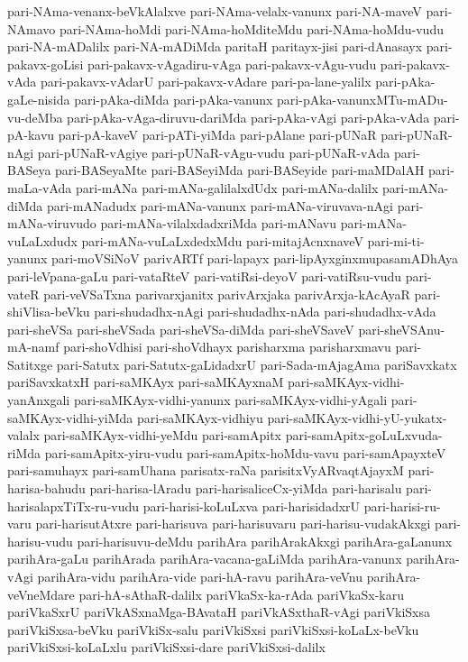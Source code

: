 {pari-NAma-venanx-beVkAlalxve
pari-NAma-velalx-vanunx
pari-NA-maveV
pari-NAmavo
pari-NAma-hoMdi
pari-NAma-hoMditeMdu
pari-NAma-hoMdu-vudu
pari-NA-mADalilx
pari-NA-mADiMda
paritaH
paritayx-jisi
pari-dAnasayx
pari-pakavx-goLisi
pari-pakavx-vAgadiru-vAga
pari-pakavx-vAgu-vudu
pari-pakavx-vAda
pari-pakavx-vAdarU
pari-pakavx-vAdare
pari-pa-lane-yalilx
pari-pAka-gaLe-nisida
pari-pAka-diMda
pari-pAka-vanunx
pari-pAka-vanunxMTu-mADu-vu-deMba
pari-pAka-vAga-diruvu-dariMda
pari-pAka-vAgi
pari-pAka-vAda
pari-pA-kavu
pari-pA-kaveV
pari-pATi-yiMda
pari-pAlane
pari-pUNaR
pari-pUNaR-nAgi
pari-pUNaR-vAgiye
pari-pUNaR-vAgu-vudu
pari-pUNaR-vAda
pari-BASeya
pari-BASeyaMte
pari-BASeyiMda
pari-BASeyide
pari-maMDalAH
pari-maLa-vAda
pari-mANa
pari-mANa-galilalxdUdx
pari-mANa-dalilx
pari-mANa-diMda
pari-mANadudx
pari-mANa-vanunx
pari-mANa-viruvava-nAgi
pari-mANa-viruvudo
pari-mANa-vilalxdadxriMda
pari-mANavu
pari-mANa-vuLaLxdudx
pari-mANa-vuLaLxdedxMdu
pari-mitajAcnxnaveV
pari-mi-ti-yanunx
pari-moVSiNoV
parivARTf
pari-lapayx
pari-lipAyxginxmupasamADhAya
pari-leVpana-gaLu
pari-vataRteV
pari-vatiRsi-deyoV
pari-vatiRsu-vudu
pari-vateR
pari-veVSaTxna
parivarxjanitx
parivArxjaka
parivArxja-kAcAyaR
pari-shiVlisa-beVku
pari-shudadhx-nAgi
pari-shudadhx-nAda
pari-shudadhx-vAda
pari-sheVSa
pari-sheVSada
pari-sheVSa-diMda
pari-sheVSaveV
pari-sheVSAnu-mA-namf
pari-shoVdhisi
pari-shoVdhayx
parisharxma
parisharxmavu
pari-Satitxge
pari-Satutx
pari-Satutx-gaLidadxrU
pari-Sada-mAjagAma
pariSavxkatx
pariSavxkatxH
pari-saMKAyx
pari-saMKAyxnaM
pari-saMKAyx-vidhi-yanAnxgali
pari-saMKAyx-vidhi-yanunx
pari-saMKAyx-vidhi-yAgali
pari-saMKAyx-vidhi-yiMda
pari-saMKAyx-vidhiyu
pari-saMKAyx-vidhi-yU-yukatx-valalx
pari-saMKAyx-vidhi-yeMdu
pari-samApitx
pari-samApitx-goLuLxvuda-riMda
pari-samApitx-yiru-vudu
pari-samApitx-hoMdu-vavu
pari-samApayxteV
pari-samuhayx
pari-samUhana
parisatx-raNa
parisitxVyARvaqtAjayxM
pari-harisa-bahudu
pari-harisa-lAradu
pari-harisaliceCx-yiMda
pari-harisalu
pari-harisalapxTiTx-ru-vudu
pari-harisi-koLuLxva
pari-harisidadxrU
pari-harisi-ru-varu
pari-harisutAtxre
pari-harisuva
pari-harisuvaru
pari-harisu-vudakAkxgi
pari-harisu-vudu
pari-harisuvu-deMdu
parihAra
parihArakAkxgi
parihAra-gaLanunx
parihAra-gaLu
parihArada
parihAra-vacana-gaLiMda
parihAra-vanunx
parihAra-vAgi
parihAra-vidu
parihAra-vide
pari-hA-ravu
parihAra-veVnu
parihAra-veVneMdare
pari-hA-sAthaR-dalilx
pariVkaSx-ka-rAda
pariVkaSx-karu
pariVkaSxrU
pariVkASxnaMga-BAvataH
pariVkASxthaR-vAgi
pariVkiSxsa
pariVkiSxsa-beVku
pariVkiSx-salu
pariVkiSxsi
pariVkiSxsi-koLaLx-beVku
pariVkiSxsi-koLaLxlu
pariVkiSxsi-dare
pariVkiSxsi-dalilx
}
